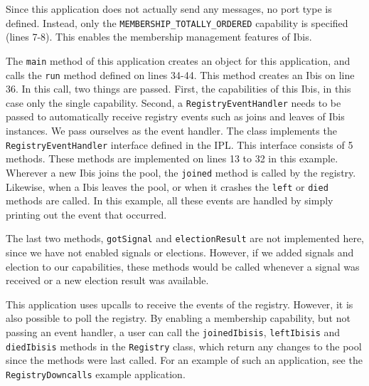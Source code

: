 Since this application does not actually send any messages, no port type
is defined. Instead, only the \texttt{MEMBERSHIP\_TOTALLY\_ORDERED}
capability is specified (lines 7-8). This enables the membership
management features of Ibis.

The \texttt{main} method of this application creates an object for this
application, and calls the \texttt{run} method defined on lines 34-44.
This method creates an Ibis on line 36. In this call, two things are
passed. First, the capabilities of this Ibis, in this case only the
single capability. Second, a \texttt{RegistryEventHandler} needs to be
passed to automatically receive registry events such as joins and leaves
of Ibis instances. We pass ourselves as the event handler. The class
implements the \texttt{RegistryEventHandler} interface defined in the
IPL. This interface consists of 5 methods. These methods are implemented
on lines 13 to 32 in this example. Wherever a new Ibis joins the pool,
the \texttt{joined} method is called by the registry. Likewise, when a
Ibis leaves the pool, or when it crashes the \texttt{left} or
\texttt{died} methods are called. In this example, all these events are
handled by simply printing out the event that occurred.

The last two methods, \texttt{gotSignal} and \texttt{electionResult} are
not implemented here, since we have not enabled signals or elections.
However, if we added signals and election to our capabilities, these
methods would be called whenever a signal was received or a new election
result was available.

This application uses upcalls to receive the events of the registry.
However, it is also possible to poll the registry. By enabling a
membership capability, but not passing an event handler, a user can call
the \texttt{joinedIbisis}, \texttt{leftIbisis} and \texttt{diedIbisis}
methods in the \texttt{Registry} class, which return any changes to the
pool since the methods were last called. For an example of such an
application, see the \texttt{RegistryDowncalls} example application.

